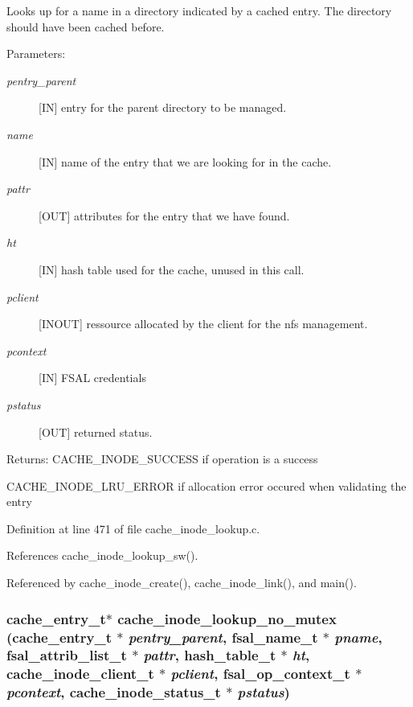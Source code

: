 Looks up for a name in a directory indicated by a cached entry. The directory should have been cached before.

\begin{Desc}
\item[Parameters:]
\begin{description}
\item[{\em pentry\_\-parent}][IN] entry for the parent directory to be managed. \item[{\em name}][IN] name of the entry that we are looking for in the cache. \item[{\em pattr}][OUT] attributes for the entry that we have found. \item[{\em ht}][IN] hash table used for the cache, unused in this call. \item[{\em pclient}][INOUT] ressource allocated by the client for the nfs management. \item[{\em pcontext}][IN] FSAL credentials \item[{\em pstatus}][OUT] returned status.\end{description}
\end{Desc}
\begin{Desc}
\item[Returns:]CACHE\_\-INODE\_\-SUCCESS if operation is a success \par
 

CACHE\_\-INODE\_\-LRU\_\-ERROR if allocation error occured when validating the entry \end{Desc}


Definition at line 471 of file cache\_\-inode\_\-lookup.c.

References cache\_\-inode\_\-lookup\_\-sw().

Referenced by cache\_\-inode\_\-create(), cache\_\-inode\_\-link(), and main().
\subsubsection{\setlength{\rightskip}{0pt plus 5cm}cache\_\-entry\_\-t$\ast$ cache\_\-inode\_\-lookup\_\-no\_\-mutex (cache\_\-entry\_\-t $\ast$ {\em pentry\_\-parent}, fsal\_\-name\_\-t $\ast$ {\em pname}, fsal\_\-attrib\_\-list\_\-t $\ast$ {\em pattr}, hash\_\-table\_\-t $\ast$ {\em ht}, cache\_\-inode\_\-client\_\-t $\ast$ {\em pclient}, fsal\_\-op\_\-context\_\-t $\ast$ {\em pcontext}, cache\_\-inode\_\-status\_\-t $\ast$ {\em pstatus})}\label{cache__inode__lookup_8c_a1}


